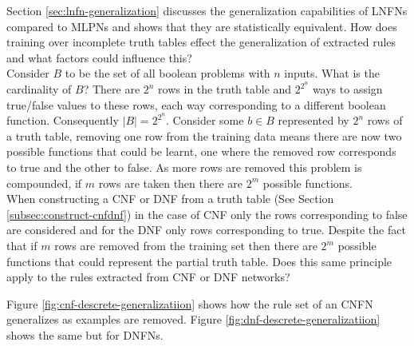 Section \ref{sec:lnfn-generalization} discusses the generalization capabilities of LNFNs compared to MLPNs and shows that they are statistically equivalent. How does training over incomplete truth tables effect the generalization of extracted rules and what factors could influence this?\\

Consider $B$ to be the set of all boolean problems with $n$ inputs. What is the cardinality of $B$? There are $2^n$ rows in the truth table and $2^{2^n}$ ways to assign true/false values to these rows, each way corresponding to a different boolean function. Consequently $|B| = 2^{2^n}$. Consider some $b \in B$ represented by $2^n$ rows of a truth table, removing one row from the training data means there are now two possible functions that could be learnt, one where the removed row corresponds to true and the other to false. As more rows are removed this problem is compounded, if $m$ rows are taken then there are $2^m$ possible functions.\\

When constructing a CNF or DNF from a truth table (See Section \ref{subsec:construct-cnfdnf}) in the case of CNF only the rows corresponding to false are considered and for the DNF only rows corresponding to true. Despite the fact that if $m$ rows are removed from the training set then there are $2^m$ possible functions that could represent the partial truth table. Does this same principle apply to the rules extracted from CNF or DNF networks?

Figure \ref{fig:cnf-descrete-generalizatiion} shows how the rule set of an CNFN generalizes as examples are removed. Figure \ref{fig:dnf-descrete-generalizatiion} shows the same but for DNFNs.

